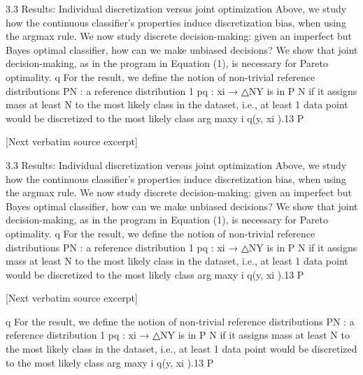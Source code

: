 \documentclass[10pt]{article}
\begin{document}
\begin{ReviewVerbatim}
3.3     Results: Individual discretization versus joint optimization
Above, we study how the continuous classifier’s properties induce discretization bias, when using the argmax
rule. We now study discrete decision-making: given an imperfect but Bayes optimal classifier, how can
we make unbiased decisions? We show that joint decision-making, as in the program in Equation (1), is
necessary for Pareto optimality.
                                                                                     q
    For the result, we define the notion of non-trivial reference distributions PN     : a reference distribution
                                                       1
pq : {xi } → △NY is in P N if it assigns mass at least N to the most likely class in the  dataset, i.e., at least 1
data point would be discretized to the most likely class arg maxy i q(y, xi ).13
                                                                   P


[Next verbatim source excerpt]

3.3     Results: Individual discretization versus joint optimization
Above, we study how the continuous classifier’s properties induce discretization bias, when using the argmax
rule. We now study discrete decision-making: given an imperfect but Bayes optimal classifier, how can
we make unbiased decisions? We show that joint decision-making, as in the program in Equation (1), is
necessary for Pareto optimality.
                                                                                     q
    For the result, we define the notion of non-trivial reference distributions PN     : a reference distribution
                                                       1
pq : {xi } → △NY is in P N if it assigns mass at least N to the most likely class in the  dataset, i.e., at least 1
data point would be discretized to the most likely class arg maxy i q(y, xi ).13
                                                                   P


[Next verbatim source excerpt]

                                                                                     q
    For the result, we define the notion of non-trivial reference distributions PN     : a reference distribution
                                                       1
pq : {xi } → △NY is in P N if it assigns mass at least N to the most likely class in the  dataset, i.e., at least 1
data point would be discretized to the most likely class arg maxy i q(y, xi ).13
                                                                   P
\end{ReviewVerbatim}
\end{document}

